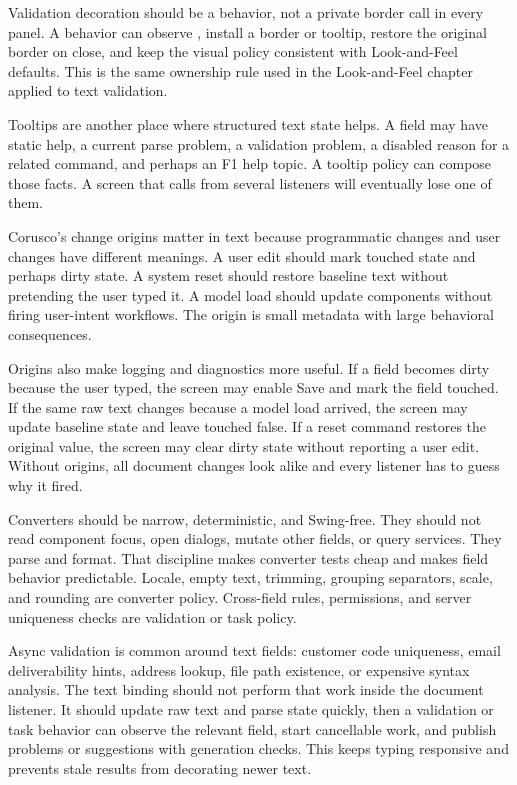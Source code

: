 Validation decoration should be a behavior, not a private border call in every panel. A behavior can observe , install a border or tooltip, restore the original border on close, and keep the visual policy consistent with Look-and-Feel defaults. This is the same ownership rule used in the Look-and-Feel chapter applied to text validation.

Tooltips are another place where structured text state helps. A field may have static help, a current parse problem, a validation problem, a disabled reason for a related command, and perhaps an F1 help topic. A tooltip policy can compose those facts. A screen that calls  from several listeners will eventually lose one of them.

Corusco's change origins matter in text because programmatic changes and user changes have different meanings. A user edit should mark touched state and perhaps dirty state. A system reset should restore baseline text without pretending the user typed it. A model load should update components without firing user-intent workflows. The origin is small metadata with large behavioral consequences.

Origins also make logging and diagnostics more useful. If a field becomes dirty
because the user typed, the screen may enable Save and mark the field touched.
If the same raw text changes because a model load arrived, the screen may
update baseline state and leave touched false. If a reset command restores the
original value, the screen may clear dirty state without reporting a user edit.
Without origins, all document changes look alike and every listener has to
guess why it fired.

Converters should be narrow, deterministic, and Swing-free. They should not
read component focus, open dialogs, mutate other fields, or query services.
They parse and format. That discipline makes converter tests cheap and makes
field behavior predictable. Locale, empty text, trimming, grouping separators,
scale, and rounding are converter policy. Cross-field rules, permissions, and
server uniqueness checks are validation or task policy.

Async validation is common around text fields: customer code uniqueness, email
deliverability hints, address lookup, file path existence, or expensive syntax
analysis. The text binding should not perform that work inside the document
listener. It should update raw text and parse state quickly, then a validation
or task behavior can observe the relevant field, start cancellable work, and
publish problems or suggestions with generation checks. This keeps typing
responsive and prevents stale results from decorating newer text.

